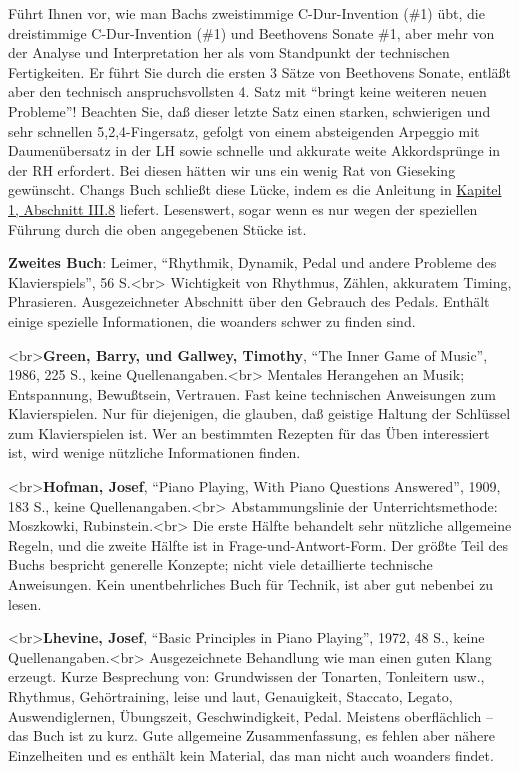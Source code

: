 Führt Ihnen vor, wie man Bachs zweistimmige C-Dur-Invention (\#1) übt, die dreistimmige C-Dur-Invention (\#1) und Beethovens Sonate \#1, aber mehr von der Analyse und Interpretation her als vom Standpunkt der technischen Fertigkeiten.
Er führt Sie durch die ersten 3 Sätze von Beethovens Sonate, entläßt aber den technisch anspruchsvollsten 4. Satz mit \enquote{bringt keine weiteren neuen Probleme}!
Beachten Sie, daß dieser letzte Satz einen starken, schwierigen und sehr schnellen 5,2,4-Fingersatz, gefolgt von einem absteigenden Arpeggio mit Daumenübersatz in der LH sowie schnelle und akkurate weite Akkordsprünge in der RH erfordert.
Bei diesen hätten wir uns ein wenig Rat von Gieseking gewünscht.
Changs Buch schließt diese Lücke, indem es die Anleitung in \hyperref[c1iii8]{Kapitel 1, Abschnitt III.8} liefert.
Lesenswert, sogar wenn es nur wegen der speziellen Führung durch die oben angegebenen Stücke ist.

\textbf{Zweites Buch}: Leimer, \enquote{Rhythmik, Dynamik, Pedal und andere Probleme des Klavierspiels}, 56 S.<br>
Wichtigkeit von Rhythmus, Zählen, akkuratem Timing, Phrasieren.
Ausgezeichneter Abschnitt über den Gebrauch des Pedals.
Enthält einige spezielle Informationen, die woanders schwer zu finden sind.


\label{Green}

<br>\textbf{Green, Barry, und Gallwey, Timothy}, \enquote{The Inner Game of Music}, 1986, 225 S., keine Quellenangaben.<br>
 Mentales Herangehen an Musik; Entspannung, Bewußtsein, Vertrauen.
Fast keine technischen Anweisungen zum Klavierspielen.
Nur für diejenigen, die glauben, daß geistige Haltung der Schlüssel zum Klavierspielen ist.
Wer an bestimmten Rezepten für das Üben interessiert ist, wird wenige nützliche Informationen finden.


\label{Hofman}

<br>\textbf{Hofman, Josef}, \enquote{Piano Playing, With Piano Questions Answered}, 1909, 183 S., keine Quellenangaben.<br>
Abstammungslinie der Unterrichtsmethode: Moszkowki, Rubinstein.<br>
Die erste Hälfte behandelt sehr nützliche allgemeine Regeln, und die zweite Hälfte ist in Frage-und-Antwort-Form.
Der größte Teil des Buchs bespricht generelle Konzepte; nicht viele detaillierte technische Anweisungen.
Kein unentbehrliches Buch für Technik, ist aber gut nebenbei zu lesen.


\label{Lhevine}

<br>\textbf{Lhevine, Josef}, \enquote{Basic Principles in Piano Playing}, 1972, 48 S., keine Quellenangaben.<br> Ausgezeichnete Behandlung wie man einen guten Klang erzeugt.
Kurze Besprechung von: Grundwissen der Tonarten, Tonleitern usw., Rhythmus, Gehörtraining, leise und laut, Genauigkeit, Staccato, Legato, Auswendiglernen, Übungszeit, Geschwindigkeit, Pedal.
Meistens oberflächlich -- das Buch ist zu kurz.
Gute allgemeine Zusammenfassung, es fehlen aber nähere Einzelheiten und es enthält kein Material, das man nicht auch woanders findet.


